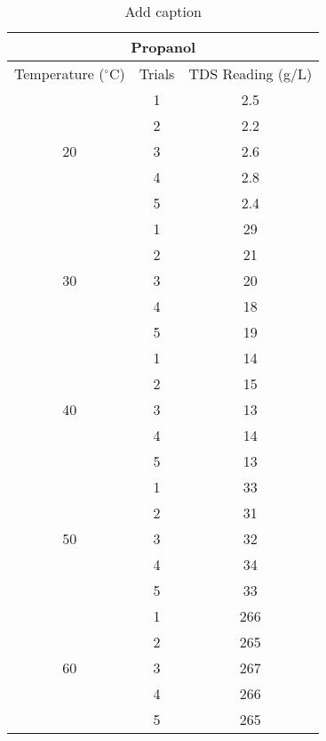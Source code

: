 

\begin{table}[H]
  \centering
  \caption{Add caption}
    \begin{tabular}{ccc}
    \toprule
    \multicolumn{3}{c}{Propanol} \\
    \midrule
    Temperature ($^\circ$C) & Trials & TDS Reading (g/L)  \\
    \midrule
    \multirow{5}[10]{*}{20} & 1     & 2.5 \\
\cmidrule{2-3}          & 2     & 2.2 \\
\cmidrule{2-3}          & 3     & 2.6 \\
\cmidrule{2-3}          & 4     & 2.8 \\
\cmidrule{2-3}          & 5     & 2.4 \\
    \midrule
    \multirow{5}[10]{*}{30} & 1     & 29 \\
\cmidrule{2-3}          & 2     & 21 \\
\cmidrule{2-3}          & 3     & 20 \\
\cmidrule{2-3}          & 4     & 18 \\
\cmidrule{2-3}          & 5     & 19 \\
    \midrule
    \multirow{5}[10]{*}{40} & 1     & 14 \\
\cmidrule{2-3}          & 2     & 15 \\
\cmidrule{2-3}          & 3     & 13 \\
\cmidrule{2-3}          & 4     & 14 \\
\cmidrule{2-3}          & 5     & 13 \\
    \midrule
    \multirow{5}[10]{*}{50} & 1     & 33 \\
\cmidrule{2-3}          & 2     & 31 \\
\cmidrule{2-3}          & 3     & 32 \\
\cmidrule{2-3}          & 4     & 34 \\
\cmidrule{2-3}          & 5     & 33 \\
    \midrule
    \multirow{5}[10]{*}{60} & 1     & 266 \\
\cmidrule{2-3}          & 2     & 265 \\
\cmidrule{2-3}          & 3     & 267 \\
\cmidrule{2-3}          & 4     & 266 \\
\cmidrule{2-3}          & 5     & 265 \\
    \bottomrule
    \end{tabular}%
  \label{tab:addlabel}%
\end{table}%

